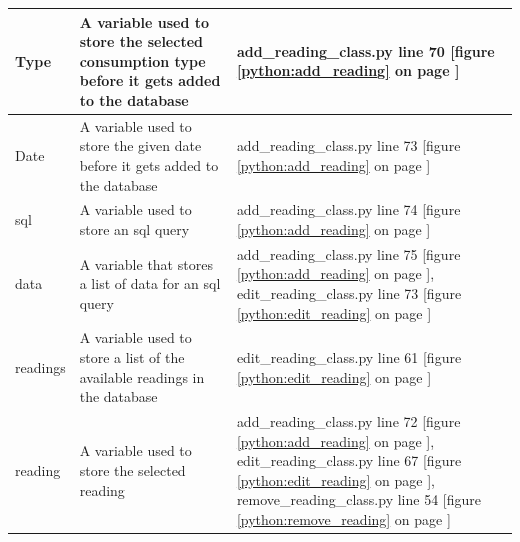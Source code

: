 \begin{center}
\begin{tabular}{|p{4cm}|p{4.5cm}|p{4.5cm}|}
	Type & A variable used to store the selected consumption type before it gets added to the database & add\_reading\_class.py line 70 [figure \ref{python:add_reading} on page \pageref{python:add_reading}] \\ \hline
	Date & A variable used to store the given date before it gets added to the database & add\_reading\_class.py line 73 [figure \ref{python:add_reading} on page \pageref{python:add_reading}] \\ \hline
	sql & A variable used to store an sql query & add\_reading\_class.py line 74 [figure \ref{python:add_reading} on page \pageref{python:add_reading}] \\ \hline
	data & A variable that stores a list of data for an sql query & add\_reading\_class.py line 75 [figure \ref{python:add_reading} on page \pageref{python:add_reading}], edit\_reading\_class.py line 73 [figure \ref{python:edit_reading} on page \pageref{python:edit_reading}] \\ \hline
	readings & A variable used to store a list of the available readings in the database & edit\_reading\_class.py line 61 [figure \ref{python:edit_reading} on page \pageref{python:edit_reading}] \\ \hline
	reading & A variable used to store the selected reading & add\_reading\_class.py line 72 [figure \ref{python:add_reading} on page \pageref{python:add_reading}], edit\_reading\_class.py line 67 [figure \ref{python:edit_reading} on page \pageref{python:edit_reading}], remove\_reading\_class.py line 54 [figure \ref{python:remove_reading} on page \pageref{python:remove_reading}] \\ \hline
	\end{tabular}


\end{center}
